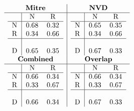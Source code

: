 \documentclass[11pt]{article}
\begin{document}
\begin{table}
	\centering
	\caption{Confusion matrices userInteraction}
	\label{table:mitre-userInteraction}
	\[
		\begin{array}{c|c}
			\textbf{Mitre}    & \textbf{NVD}     \\
			\hline
			\begin{tabular}{l|cc}
				  & N    & R    \\
				\hline
				N & 0.68 & 0.32 \\
				R & 0.34 & 0.66 \\
				\hline          \\
				D & 0.65 & 0.35 \\
			\end{tabular}
			                  &
			\begin{tabular}{l|cc}
				  & N    & R    \\
				\hline
				N & 0.65 & 0.35 \\
				R & 0.34 & 0.66 \\
				\hline          \\
				D & 0.67 & 0.33 \\
			\end{tabular}
			\\
			\textbf{Combined} & \textbf{Overlap} \\
			\hline
			\begin{tabular}{l|cc}
				  & N    & R    \\
				\hline
				N & 0.66 & 0.34 \\
				R & 0.33 & 0.67 \\
				\hline          \\
				D & 0.66 & 0.34 \\
			\end{tabular}
			                  &
			\begin{tabular}{l|cc}
				  & N    & R    \\
				\hline
				N & 0.66 & 0.34 \\
				R & 0.33 & 0.67 \\
				\hline          \\
				D & 0.67 & 0.33 \\
			\end{tabular}
		\end{array}
	\]
\end{table}
\end{document}
